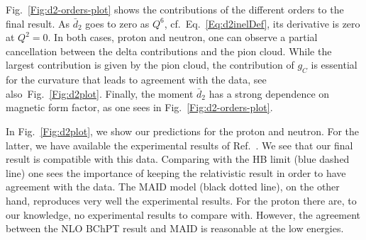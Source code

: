 \documentclass[twocolumn,prc,showpacs,nofootinbib,preprintnumbers,amsmath,amssymb,superscriptaddress]{revtex4-1}
\begin{document}

Fig.~\ref{Fig:d2-orders-plot} shows the contributions of the different orders to the final result. As $\bar{d}_2$ goes to zero as $Q^6$, cf.\ Eq.~\eqref{Eq:d2inelDef}, its derivative is zero at $Q^2=0$. In both cases, proton and neutron, one can observe a partial cancellation between the delta contributions and the pion cloud.
While the largest contribution is given by the pion cloud, the contribution of $g_C$ is essential for the curvature that leads to agreement with the data, see also\ Fig.~\ref{Fig:d2plot}. Finally, the moment $\bar{d}_2$ has a strong dependence on magnetic form factor, as one sees in Fig.~\ref{Fig:d2-orders-plot}. 

In Fig.~\ref{Fig:d2plot}, we show our predictions for the proton and neutron. 
For the latter, we have available the experimental results of Ref.~\cite{Amarian:2003jy}.
We see that our final result is compatible with this data. 
Comparing with the HB limit \cite{Kao:2002cp,Kao:2003jd} (blue dashed line) one sees the importance of keeping the relativistic result in order to have agreement with the data.
The MAID model \cite{MAID} (black dotted line), on the other hand, reproduces very well the experimental results.
For the proton there are, to our knowledge, no experimental results to compare with. However, the agreement between the NLO BChPT result and MAID is reasonable at the low energies.
\end{document}
